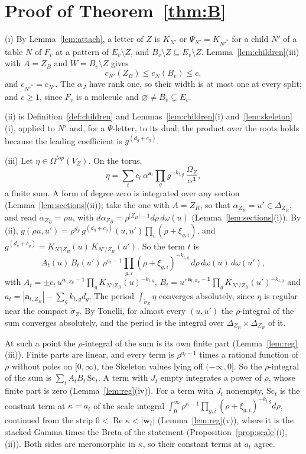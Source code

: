 \documentclass[11pt]{article}
\theoremstyle{plain}
\theoremstyle{definition}
\theoremstyle{remark}
\newcommand{\tsig}{\widetilde\sigma}
\DeclareMathOperator{\re}{Re}
\begin{document}
\section{Proof of Theorem~\ref{thm:B}}\label{sec:proofB}

(i) By Lemma~\ref{lem:attach}, a letter of $Z$ is $K_{N'}$ or $\Psi_{N'}=K_{N'^\ast}$ for a child $N'$ of a table $N$ of $F_v$ at a pattern of $E_v\setminus Z$, and $B_v\setminus Z\subseteq E_v\setminus Z$. Lemma~\ref{lem:children}(iii) with $A=Z_B$ and $W=B_v\setminus Z$ gives
\[
c_{N'}(Z_B)\le c_N(B_v)\le c,
\]
and $c_{N'^\ast}=c_{N'}$. The $\alpha_J$ have rank one, so their width is at most one at every split; and $c\ge1$, since $F_v$ is a molecule and $\varnothing\neq B_v\subsetneq E_v$.

(ii) is Definition~\ref{def:children} and Lemmas~\ref{lem:children}(i) and~\ref{lem:skeleton}(i), applied to $N'$ and, for a $\Psi$-letter, to its dual; the product over the roots holds because the leading coefficient is $g^{(d_g+c_g)}$.

(iii) Let $\eta\in\Omega^{top}(V_Z)$. On the torus,
\[
\eta=\sum_tc_t\,\alpha^{\mathbf a_t}\prod_gg^{-k_{t,g}}\,\frac{\Omega_Z}{\alpha^{\mathbf 1}},
\]
a finite sum. A form of degree zero is integrated over any section (Lemma~\ref{lem:sections}(ii)); take the one with $A=Z_R$, so that $\alpha_{Z_R}=u'\in\Delta_{Z_R}$, and read $\alpha_{Z_B}=\rho u$, with $d\alpha_{Z_B}=\rho^{|Z_B|-1}d\rho\,d\omega(u)$ (Lemma~\ref{lem:sections}(i)). By (ii), $g(\rho u,u')=\rho^{d_g}\,g^{(d_g+c_g)}(u,u')\prod_i(\rho+\xi_{g,i})$, and $g^{(d_g+c_g)}=K_{N'|Z_B}(u)\,K_{N'/Z_B}(u')$. So the term $t$ is
\[
A_t(u)\,B_t(u')\,\rho^{a_t-1}\prod_{g,i}(\rho+\xi_{g,i})^{-k_{t,g}}\,d\rho\,d\omega(u)\,d\omega(u'),
\]
with $A_t=\pm c_t\,u^{\mathbf a_{t,Z_B}-\mathbf 1}\prod_gK_{N'|Z_B}(u)^{-k_{t,g}}$, $B_t=u'^{\,\mathbf a_{t,Z_R}-\mathbf 1}\prod_gK_{N'/Z_B}(u')^{-k_{t,g}}$ and $a_t=|\mathbf a_{t,Z_B}|-\sum_gk_{t,g}d_g$. The period $\int_{\tsig_Z}\eta$ converges absolutely, since $\eta$ is regular near the compact $\tsig_Z$. By Tonelli, for almost every $(u,u')$ the $\rho$-integral of the sum converges absolutely, and the period is the integral over $\Delta_{Z_B}\times\Delta_{Z_R}$ of it.

At such a point the $\rho$-integral of the sum is its own finite part (Lemma~\ref{lem:reg}(iii)). Finite parts are linear, and every term is $\rho^{a_t-1}$ times a rational function of $\rho$ without poles on $[0,\infty)$, the Skeleton values lying off $(-\infty,0]$. So the $\rho$-integral of the sum is $\sum_tA_tB_t\,\mathrm{Sc}_t$. A term with $J_t$ empty integrates a power of $\rho$, whose finite part is zero (Lemma~\ref{lem:reg}(iv)). For a term with $J_t$ nonempty, $\mathrm{Sc}_t$ is the constant term at $\kappa=a_t$ of the scale integral $\int_0^\infty\rho^{\kappa-1}\prod_{g,i}(\rho+\xi_{g,i})^{-k_{t,g}}d\rho$, continued from the strip $0<\re\kappa<|\mathbf w_t|$ (Lemma~\ref{lem:reg}(v)), where it is the stacked Gamma times the Breta of the statement (Proposition~\ref{prop:scale}(i),(ii)). Both sides are meromorphic in $\kappa$, so their constant terms at $a_t$ agree.
\end{document}
